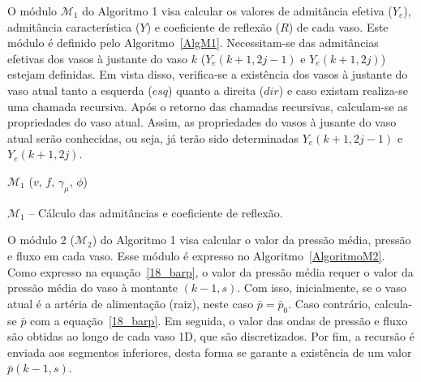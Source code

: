 \documentclass[a4paper,12pt]{monografia}
\theoremstyle{plain}
\theoremstyle{definition}
\theoremstyle{remark}
\begin{document}
O módulo $\mathcal{M}_1$ do Algoritmo 1  visa calcular os valores de admitância efetiva ($Y_e$), admitância característica ($Y$) e coeficiente de reflexão ($R$) de cada vaso. Este módulo é definido pelo Algoritmo~\ref{AlgM1}. Necessitam-se das admitâncias efetivas dos vasos à justante do vaso $k$ ($Y_e(k+1,2j-1)$ e $Y_e(k+1,2j)$) estejam definidas. Em vista disso, verifica-se a existência dos vasos à justante do vaso atual tanto a esquerda ($esq$) quanto a direita ($dir$) e caso existam realiza-se uma chamada recursiva. Após o retorno das chamadas recursivas, calculam-se as propriedades do vaso atual. Assim, as propriedades do vasos à jusante do vaso atual serão conhecidas, ou seja, já terão sido determinadas $Y_e(k+1,2j-1)$ e $Y_e(k+1,2j)$.
\newpage

\begin{algorithm}[H]
	$\mathcal{M}_1$ ($v$, $f$, $\gamma_{\mu}$, $\phi$) \\
	\caption{$\mathcal{M}_1$ -- Cálculo das admitâncias e coeficiente de reflexão.}
	\label{AlgM1}
\end{algorithm}

O módulo 2 ($\mathcal{M}_2$) do Algoritmo 1 visa calcular o valor da pressão média, pressão e fluxo em cada vaso. Esse módulo é expresso no Algoritmo~\ref{AlgoritmoM2}. Como expresso na equação~\eqref{18_barp}, o valor da pressão média requer o valor da pressão média do vaso à montante $(k-1,s)$. Com isso, inicialmente, se o vaso atual é a artéria de alimentação (raiz), neste caso $\bar{p} = \bar{p}_0$. Caso contrário, calcula-se $\bar{p}$ com a equação~\eqref{18_barp}. Em seguida, o valor das ondas de pressão e fluxo são obtidas ao longo de cada vaso 1D, que são discretizados. Por fim, a recursão é enviada aos segmentos inferiores, desta forma se garante a existência de um valor $\bar{p}(k-1,s)$.
\end{document}
